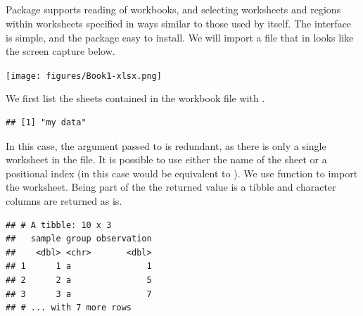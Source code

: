 \documentclass[krantz2]{krantz}\usepackage{knitr}
\begin{document}
\subsection[`readxl']{}\label{sec:files:excel}



Package  supports reading of  workbooks, and selecting worksheets and regions within worksheets specified in ways similar to those used by  itself. The interface is simple, and the package easy to install. We will import a file that in  looks like the screen capture below.

\begin{center}
\texttt{[image: figures/Book1-xlsx.png]}
\end{center}

We first list the sheets contained in the workbook file with .

\begin{knitrout}\footnotesize
{}\color{fgcolor}\begin{kframe}
\begin{alltt}
 \hlkwb{<-} \hlstd{(}\hlstd{)}
\end{alltt}
\begin{verbatim}
## [1] "my data"
\end{verbatim}
\end{kframe}
\end{knitrout}

In this case, the argument passed to  is redundant, as there is only a single worksheet in the file. It is possible to use either the name of the sheet or a positional index (in this case  would be equivalent to ). We use function  to import the worksheet. Being part of the  the returned value is a tibble and character columns are returned as is.

\begin{knitrout}\footnotesize
{}\color{fgcolor}\begin{kframe}
\begin{alltt}
 \hlkwb{<-} \hlstd{(}\hlstd{,}  \hlstd{=} \hlstd{)}
\end{alltt}
\begin{verbatim}
## # A tibble: 10 x 3
##   sample group observation
##    <dbl> <chr>       <dbl>
## 1      1 a               1
## 2      2 a               5
## 3      3 a               7
## # ... with 7 more rows
\end{verbatim}
\end{kframe}
\end{knitrout}
\end{document}
